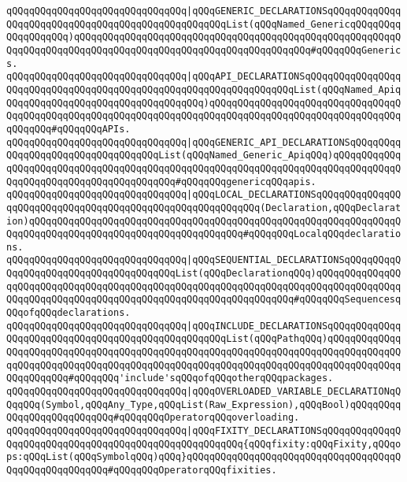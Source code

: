 \verb|qQQqqQQqqQQqqQQqqQQqqQQqqQQqqQQq|\verb#|qQQqGENERIC_DECLARATIONSqQQqqQQqqQQqqQQqqQQqqQQqqQQqqQQqqQQqqQQqqQQqqQQqqQQqList(qQQqNamed_GenericqQQqqQQqqQQqqQQqqQQq)qQQqqQQqqQQqqQQqqQQqqQQqqQQqqQQqqQQqqQQqqQQqqQQqqQQqqQQqqQQqqQQqqQQqqQQqqQQqqQQqqQQqqQQqqQQqqQQqqQQqqQQqqQQqqQQq#\verb|#qQQqqQQqGenerics.|\newline
\verb|qQQqqQQqqQQqqQQqqQQqqQQqqQQqqQQq|\verb#|qQQqAPI_DECLARATIONSqQQqqQQqqQQqqQQqqQQqqQQqqQQqqQQqqQQqqQQqqQQqqQQqqQQqqQQqqQQqqQQqqQQqList(qQQqNamed_ApiqQQqqQQqqQQqqQQqqQQqqQQqqQQqqQQqqQQq)qQQqqQQqqQQqqQQqqQQqqQQqqQQqqQQqqQQqqQQqqQQqqQQqqQQqqQQqqQQqqQQqqQQqqQQqqQQqqQQqqQQqqQQqqQQqqQQqqQQqqQQqqQQqqQQq#\verb|#qQQqqQQqAPIs.|\newline
\verb|qQQqqQQqqQQqqQQqqQQqqQQqqQQqqQQq|\verb#|qQQqGENERIC_API_DECLARATIONSqQQqqQQqqQQqqQQqqQQqqQQqqQQqqQQqqQQqList(qQQqNamed_Generic_ApiqQQq)qQQqqQQqqQQqqQQqqQQqqQQqqQQqqQQqqQQqqQQqqQQqqQQqqQQqqQQqqQQqqQQqqQQqqQQqqQQqqQQqqQQqqQQqqQQqqQQqqQQqqQQqqQQqqQQq#\verb|#qQQqqQQqgenericqQQqapis.|\newline
\verb|qQQqqQQqqQQqqQQqqQQqqQQqqQQqqQQq|\verb#|qQQqLOCAL_DECLARATIONSqQQqqQQqqQQqqQQqqQQqqQQqqQQqqQQqqQQqqQQqqQQqqQQqqQQqqQQqqQQq(Declaration,qQQqDeclaration)qQQqqQQqqQQqqQQqqQQqqQQqqQQqqQQqqQQqqQQqqQQqqQQqqQQqqQQqqQQqqQQqqQQqqQQqqQQqqQQqqQQqqQQqqQQqqQQqqQQqqQQqqQQq#\verb|#qQQqqQQqLocalqQQqdeclarations.|\newline
\verb|qQQqqQQqqQQqqQQqqQQqqQQqqQQqqQQq|\verb#|qQQqSEQUENTIAL_DECLARATIONSqQQqqQQqqQQqqQQqqQQqqQQqqQQqqQQqqQQqqQQqList(qQQqDeclarationqQQq)qQQqqQQqqQQqqQQqqQQqqQQqqQQqqQQqqQQqqQQqqQQqqQQqqQQqqQQqqQQqqQQqqQQqqQQqqQQqqQQqqQQqqQQqqQQqqQQqqQQqqQQqqQQqqQQqqQQqqQQqqQQqqQQqqQQqqQQq#\verb|#qQQqqQQqSequencesqQQqofqQQqdeclarations.|\newline
\verb|qQQqqQQqqQQqqQQqqQQqqQQqqQQqqQQq|\verb#|qQQqINCLUDE_DECLARATIONSqQQqqQQqqQQqqQQqqQQqqQQqqQQqqQQqqQQqqQQqqQQqqQQqqQQqList(qQQqPathqQQq)qQQqqQQqqQQqqQQqqQQqqQQqqQQqqQQqqQQqqQQqqQQqqQQqqQQqqQQqqQQqqQQqqQQqqQQqqQQqqQQqqQQqqQQqqQQqqQQqqQQqqQQqqQQqqQQqqQQqqQQqqQQqqQQqqQQqqQQqqQQqqQQqqQQqqQQqqQQqqQQqqQQq#\verb|#qQQqqQQq'include'sqQQqofqQQqotherqQQqpackages.|\newline
\verb|qQQqqQQqqQQqqQQqqQQqqQQqqQQqqQQq|\verb#|qQQqOVERLOADED_VARIABLE_DECLARATIONqQQqqQQq(Symbol,qQQqAny_Type,qQQqList(Raw_Expression),qQQqBool)qQQqqQQqqQQqqQQqqQQqqQQqqQQq#\verb|#qQQqqQQqOperatorqQQqoverloading.|\newline
\verb|qQQqqQQqqQQqqQQqqQQqqQQqqQQqqQQq|\verb#|qQQqFIXITY_DECLARATIONSqQQqqQQqqQQqqQQqqQQqqQQqqQQqqQQqqQQqqQQqqQQqqQQqqQQqqQQq{qQQqfixity:qQQqFixity,qQQqops:qQQqList(qQQqSymbolqQQq)qQQq}qQQqqQQqqQQqqQQqqQQqqQQqqQQqqQQqqQQqqQQqqQQqqQQqqQQqqQQq#\verb|#qQQqqQQqOperatorqQQqfixities.|\newline
